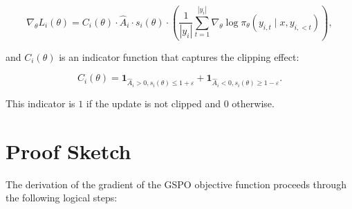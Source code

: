 \documentclass{article}
\begin{document}
$$
\nabla_\theta L_i(\theta) = C_i(\theta) \cdot \hat{A}_i \cdot s_i(\theta) \cdot \left( \frac{1}{|y_i|} \sum_{t=1}^{|y_i|} \nabla_\theta \log \pi_\theta(y_{i,t} \mid x, y_{i,<t}) \right),
$$

and $C_i(\theta)$ is an indicator function that captures the clipping effect:

$$
C_i(\theta) = \mathbf{1}_{\hat{A}_i > 0, s_i(\theta) \le 1+\varepsilon} + \mathbf{1}_{\hat{A}_i < 0, s_i(\theta) \ge 1-\varepsilon}.
$$

This indicator is $1$ if the update is not clipped and $0$ otherwise.


\section{Proof Sketch} 

The derivation of the gradient of the GSPO objective function proceeds through the following logical steps:
\end{document}
